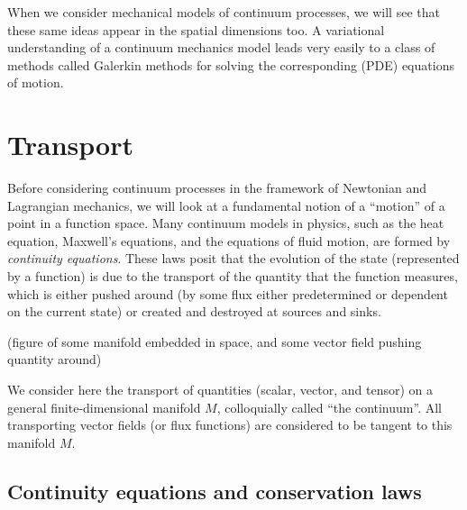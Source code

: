 \documentclass[11pt,a4paper]{memoir}
\begin{document}
When we consider mechanical models of continuum processes, we will see that these same ideas appear in the spatial dimensions too.
A variational understanding of a continuum mechanics model leads very easily to a class of methods called Galerkin methods for solving
the corresponding (PDE) equations of motion.


\section{Transport} %

Before considering continuum processes in the framework of Newtonian and Lagrangian mechanics, we will look at a fundamental notion of a ``motion''
of a point in a function space. Many continuum models in physics, such as the heat equation,
Maxwell's equations, and the equations of fluid motion, are formed by \textit{continuity equations}. These laws posit that the
evolution of the state (represented by a function) is
due to the transport of the quantity that the function measures, which is either pushed around (by some flux either predetermined or dependent on the current state)
or created and destroyed at sources and sinks.

\vskip 0.2in
(figure of some manifold embedded in space, and some vector field pushing quantity around)
\vskip 0.2in

We consider here the transport of quantities (scalar, vector, and tensor) on a general finite-dimensional manifold $M$,
colloquially called ``the continuum''. All transporting vector fields (or flux functions) are considered to be tangent to this manifold $M$.

\subsection{Continuity equations and conservation laws}\label{conservation_laws}
\end{document}
